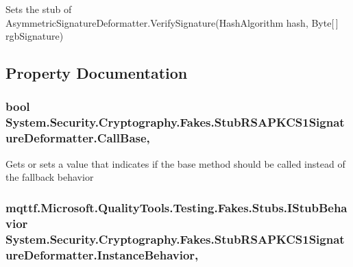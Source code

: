 Sets the stub of Asymmetric\-Signature\-Deformatter.\-Verify\-Signature(\-Hash\-Algorithm hash, Byte\mbox{[}$\,$\mbox{]} rgb\-Signature)



\subsection{Property Documentation}
\hypertarget{class_system_1_1_security_1_1_cryptography_1_1_fakes_1_1_stub_r_s_a_p_k_c_s1_signature_deformatter_ac7021eb451e2d21962c2d455b34f4f6f}{
\subsubsection[{Call\-Base}]{\setlength{\rightskip}{0pt plus 5cm}bool System.\-Security.\-Cryptography.\-Fakes.\-Stub\-R\-S\-A\-P\-K\-C\-S1\-Signature\-Deformatter.\-Call\-Base\hspace{0.3cm}{\ttfamily [get]}, {\ttfamily [set]}}}\label{class_system_1_1_security_1_1_cryptography_1_1_fakes_1_1_stub_r_s_a_p_k_c_s1_signature_deformatter_ac7021eb451e2d21962c2d455b34f4f6f}


Gets or sets a value that indicates if the base method should be called instead of the fallback behavior

\hypertarget{class_system_1_1_security_1_1_cryptography_1_1_fakes_1_1_stub_r_s_a_p_k_c_s1_signature_deformatter_af11f53cd21d69a39cee29da33c65d7f0}{
\subsubsection[{Instance\-Behavior}]{\setlength{\rightskip}{0pt plus 5cm}mqttf.\-Microsoft.\-Quality\-Tools.\-Testing.\-Fakes.\-Stubs.\-I\-Stub\-Behavior System.\-Security.\-Cryptography.\-Fakes.\-Stub\-R\-S\-A\-P\-K\-C\-S1\-Signature\-Deformatter.\-Instance\-Behavior\hspace{0.3cm}{\ttfamily [get]}, {\ttfamily [set]}}}\label{class_system_1_1_security_1_1_cryptography_1_1_fakes_1_1_stub_r_s_a_p_k_c_s1_signature_deformatter_af11f53cd21d69a39cee29da33c65d7f0}


